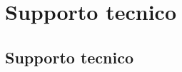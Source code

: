 \documentclass[letterpaper,10pt,english]{jupyterBook}
\begin{document}
\sphinxstepscope


\part{Supporto tecnico}

\sphinxstepscope


\chapter{Supporto tecnico}
\label{\detokenize{ch/support:supporto-tecnico}}\label{\detokenize{ch/support:programming-hs-support-hs}}\label{\detokenize{ch/support::doc}}






\renewcommand{\indexname}{Index}
\printindex
\end{document}
